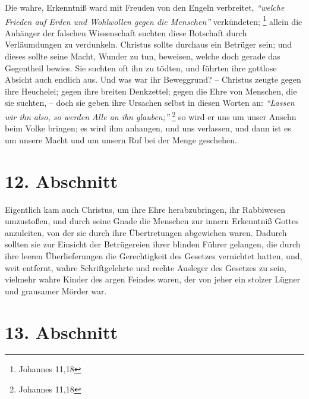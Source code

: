 Die wahre, Erkenntniß ward mit Freuden von den Engeln verbreitet,  \textit{"`welche Frieden auf Erden und Wohlwollen gegen die Menschen"'}
verkündeten;
\footnote{Johannes 11,18}
allein die Anhänger der falschen Wissenschaft
suchten diese Botschaft durch Verläumdungen zu verdunkeln. Christus sollte
durchaus ein Betrüger sein; und dieses sollte seine Macht, Wunder zu tun,
beweisen, welche doch gerade das Gegentheil bewies. Sie suchten oft ihn zu
tödten, und führten ihre gottlose Absicht auch endlich aus. Und was war ihr
Beweggrund? -- Christus zeugte gegen ihre Heuchelei; gegen ihre breiten
Denkzettel; gegen die Ehre von Menschen, die sie suchten, -- doch sie geben ihre
Ursachen selbst in diesen Worten an:
\textit{"`Lassen wir ihn also, so werden Alle an ihn glauben;"'}
\footnote{Johannes 11,18}
so wird er uns um unser Ansehn beim Volke
bringen; es wird ihm anhangen, und uns verlassen, und dann ist es um unsere
Macht und um unsern Ruf bei der Menge geschehen.

\section{12. Abschnitt} \label{kap7_ab12}

Eigentlich kam auch Christus, um ihre Ehre herabzubringen, ihr Rabbiwesen
umzustoßen, und durch seine Gnade die Menschen zur innern Erkenntniß Gottes
anzuleiten, von der sie durch ihre Übertretungen abgewichen waren. Dadurch
sollten sie zur Einsicht der Betrügereien ihrer blinden Führer gelangen, die
durch ihre leeren Überlieferungen die Gerechtigkeit des Gesetzes vernichtet
hatten, und, weit entfernt, wahre Schriftgelehrte und rechte Ausleger des
Gesetzes zu sein, vielmehr wahre Kinder des argen Feindes waren, der von jeher
ein stolzer Lügner und grausamer Mörder war.

\section{13. Abschnitt} \label{kap7_ab13}

